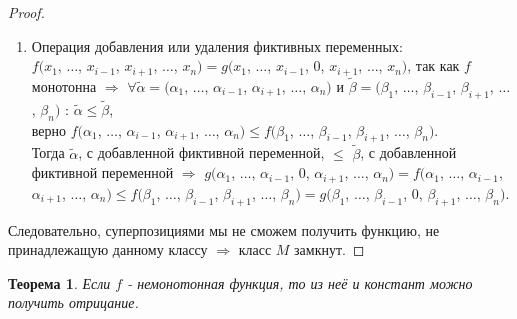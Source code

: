 \documentclass[a4paper, 12pt]{article}
\theoremstyle{definition}
\theoremstyle{plain}
\newtheorem*{theorem}{Теорема}
\theoremstyle{remark}
\begin{document}
\begin{proof}
\begin{enumerate}
      \item Операция добавления или удаления фиктивных переменных:\\$f(x_1$, $\ldots$, $x_{i-1}$, $x_{i+1}$, $\ldots$, $x_n)=g(x_1$, $\ldots$, $x_{i-1}$, $0$, $x_{i+1}$, $\ldots$, $x_n)$, так как $f$ монотонна $\Longrightarrow$ $\forall\tilde{\alpha}=(\alpha_1$, $\ldots$, $\alpha_{i-1}$, $\alpha_{i+1}$, $\ldots$, $\alpha_n)$ и $\tilde{\beta}=(\beta_1$, $\ldots$, $\beta_{i-1}$, $\beta_{i+1}$, $\ldots$, $\beta_n)$ : $\tilde{\alpha}\leqslant\tilde{\beta}$,\\верно $f(\alpha_1$, $\ldots$, $\alpha_{i-1}$, $\alpha_{i+1}$, $\ldots$, $\alpha_n)\leqslant f(\beta_1$, $\ldots$, $\beta_{i-1}$, $\beta_{i+1}$, $\ldots$, $\beta_n)$.\\ Тогда $\tilde{\alpha}$, с добавленной фиктивной переменной, $\leqslant$ $\tilde{\beta}$, с добавленной фиктивной переменной $\Longrightarrow$ $g(\alpha_1$, $\ldots$, $\alpha_{i-1}$, $0$, $\alpha_{i+1}$, $\ldots$, $\alpha_n)=f(\alpha_1$, $\ldots$, $\alpha_{i-1}$, $\alpha_{i+1}$, $\ldots$, $\alpha_n)\leqslant f(\beta_1$, $\ldots$, $\beta_{i-1}$, $\beta_{i+1}$, $\ldots$, $\beta_n)=g(\beta_1$, $\ldots$, $\beta_{i-1}$, $0$, $\beta_{i+1}$, $\ldots$, $\beta_n)$.
    \end{enumerate}
    Следовательно, суперпозициями мы не сможем получить функцию, не принадлежащую данному классу $\Longrightarrow$ класс $M$ замкнут. 
  \end{proof}
  \begin{theorem}
    Если $f$ - немонотонная функция, то из неё и констант можно получить отрицание.
  \end{theorem}
\end{document}
